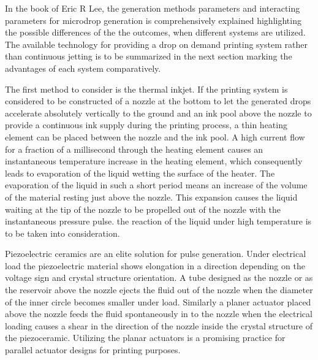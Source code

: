 In the book of Eric R Lee, the generation methods parameters and interacting parameters for microdrop generation is comprehensively explained highlighting the possible differences of the the outcomes, when different systems are utilized. The available technology for providing a drop on demand printing system rather than continuous jetting is to be summarized in the next section marking the advantages of each system comparatively.  

The first method to consider is the thermal inkjet.  If the printing system is considered to be constructed of a nozzle at the bottom to let the generated drops accelerate absolutely vertically to the ground and an ink pool above the nozzle to provide a continuous ink supply during the printing process, a thin heating element can be placed between the nozzle and the ink pool. A high current flow for a fraction of a millisecond through the heating element causes an instantaneous temperature increase in the heating element, which consequently leads to evaporation of the liquid wetting the surface of the heater. The evaporation of the liquid in such a short period means an increase of the volume of the material resting just above the nozzle. This expansion causes the liquid waiting at the tip of the nozzle to be propelled out of the nozzle with the instantaneous pressure pulse. the reaction of the liquid under high temperature is to be taken into consideration.

Piezoelectric ceramics are an elite solution for pulse generation. Under electrical load the piezoelectric material shows elongation in a direction depending on the voltage sign and crystal structure orientation. A tube designed as the nozzle or as the reservoir above the nozzle ejects the fluid out of the nozzle when the diameter of the inner circle becomes smaller under load. Similarly a planer actuator placed above the nozzle feeds the fluid spontaneously in to the nozzle when the electrical loading causes a shear in the direction of the nozzle inside the crystal structure of the piezoceramic. Utilizing the planar actuators is a promising practice for parallel actuator designs for printing purposes.\citep{lee2002microdrop}


